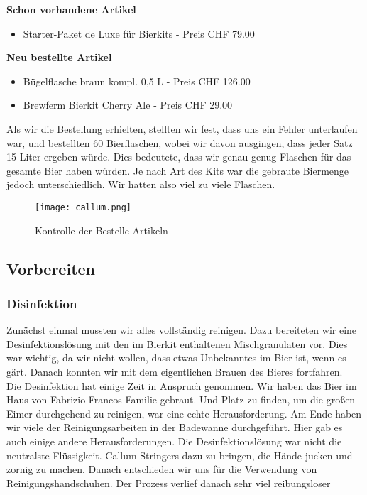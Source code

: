 \textbf{Schon vorhandene Artikel}
\begin{itemize}
	\item Starter-Paket de Luxe für Bierkits - Preis CHF 79.00
\end{itemize}
\textbf{Neu bestellte Artikel}
\begin{itemize}
	\item Bügelflasche braun kompl. 0,5 L - Preis CHF 126.00
	\item Brewferm Bierkit Cherry Ale - Preis CHF 29.00
\end{itemize}

Als wir die Bestellung erhielten, stellten wir fest, dass uns ein Fehler unterlaufen war, und bestellten 60 Bierflaschen,
 wobei wir davon ausgingen, dass jeder Satz 15 Liter ergeben würde. Dies bedeutete, dass wir genau genug Flaschen für das gesamte Bier haben würden.
 Je nach Art des Kits war die gebraute Biermenge jedoch unterschiedlich. Wir hatten also viel zu viele Flaschen.

 \begin{figure}[!h]
	\centering
	\texttt{[image: callum.png]}
	\caption{Kontrolle der Bestelle Artikeln}
\end{figure}
\newpage
\subsection{Vorbereiten}
\subsubsection{Disinfektion}
Zunächst einmal mussten wir alles vollständig reinigen.
Dazu bereiteten wir eine Desinfektionslösung mit den im Bierkit enthaltenen Mischgranulaten vor.
Dies war wichtig, da wir nicht wollen, dass etwas Unbekanntes im Bier ist, wenn es gärt.
Danach konnten wir mit dem eigentlichen Brauen des Bieres fortfahren. \\

Die Desinfektion hat einige Zeit in Anspruch genommen. Wir haben das Bier im Haus von Fabrizio Francos Familie gebraut.
Und Platz zu finden, um die großen Eimer durchgehend zu reinigen,
war eine echte Herausforderung. Am Ende haben wir viele der Reinigungsarbeiten in der Badewanne durchgeführt.
Hier gab es auch einige andere Herausforderungen. Die Desinfektionslösung war nicht die neutralste Flüssigkeit.
Callum Stringers dazu zu bringen, die Hände jucken und zornig zu machen. Danach entschieden wir uns für die Verwendung von Reinigungshandschuhen.
Der Prozess verlief danach sehr viel reibungsloser


